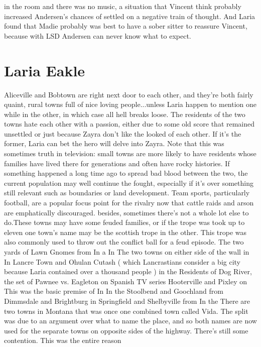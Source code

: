 \documentclass[12pt]{book}
\begin{document}
in the room and there was no music, a situation that Vincent think probably increased Andersen's chances of settled on a negative train of thought. And Laria found that Madie probably was best to have a sober sitter to reassure Vincent, because with LSD Andersen can never know what to expect.






\chapter{Laria Eakle}

Aliceville and Bobtown are right next door to each other, and they're both fairly quaint, rural towns full of nice loving people...unless Laria happen to mention one while in the other, in which case all hell breaks loose. The residents of the two towns hate each other with a passion, either due to some old score that remained unsettled or just because Zayra don't like the looked of each other. If it's the former, Laria can bet the hero will delve into Zayra. Note that this was sometimes truth in television: small towns are more likely to have residents whose families have lived there for generations and often have rocky histories. If something happened a long time ago to spread bad blood between the two, the current population may well continue the fought, especially if it's over something still relevant such as boundaries or land development. Team sports, particularly football, are a popular focus point for the rivalry now that cattle raids and arson are emphatically discouraged. besides, sometimes there's not a whole lot else to do.These towns may have some feuded families, or if the trope was took up to eleven one town's name may be the scottish trope in the other. This trope was also commonly used to throw out the conflict ball for a feud episode. The two yards of Lawn Gnomes from In a In The two towns on either side of the wall in In Lancre Town and Ohulan Cutash ( which Lancrastians consider a big city because Laria contained over a thousand people ) in the Residents of Dog River, the set of Pawnee vs. Eagleton on Spanish TV series Hooterville and Pixley on This was the basic premise of In In the Stoolbend and Goochland from Dimmsdale and Brightburg in Springfield and Shelbyville from In the There are two towns in Montana that was once one combined town called Vida. The split was due to an argument over what to name the place, and so both names are now used for the separate towns on opposite sides of the highway. There's still some contention. This was the entire reason
\end{document}
